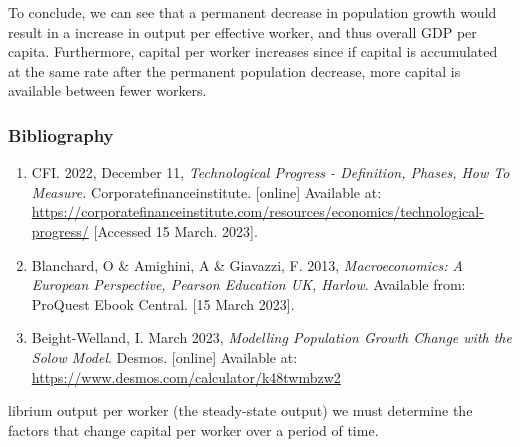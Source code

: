 \documentclass[
]{article}
\providecommand{\tightlist}{%
  \setlength{\itemsep}{0pt}\setlength{\parskip}{0pt}}
\begin{document}
To conclude, we can see that a permanent decrease in population growth
would result in a increase in output per effective worker, and thus
overall GDP per capita. Furthermore, capital per worker increases since
if capital is accumulated at the same rate after the permanent
population decrease, more capital is available between fewer workers.

\hypertarget{bibliography}{%
\subsubsection{Bibliography}\label{bibliography}}

\begin{enumerate}
\tightlist
\item
  CFI. 2022, December 11, \emph{Technological Progress - Definition,
  Phases, How To Measure.} Corporatefinanceinstitute. {[}online{]}
  Available at:
  \url{https://corporatefinanceinstitute.com/resources/economics/technological-progress/}
  {[}Accessed 15 March. 2023{]}.
\item
  Blanchard, O \& Amighini, A \& Giavazzi, F. 2013,
  \emph{Macroeconomics: A European Perspective, Pearson Education UK,
  Harlow}. Available from: ProQuest Ebook Central. {[}15 March 2023{]}.
\item
  Beight-Welland, I. March 2023, \emph{Modelling Population Growth
  Change with the Solow Model}. Desmos. {[}online{]} Available at:
  \url{https://www.desmos.com/calculator/k48twmbzw2}
\end{enumerate}

librium output per worker (the steady-state output) we must determine
the factors that change capital per worker over a period of time.
\end{document}

